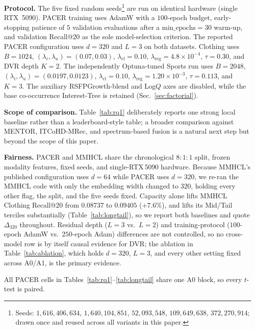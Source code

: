 \documentclass[conference]{IEEEtran}
\newcommand{\dvr}{DVR\xspace}
\begin{document}
\noindent\textbf{Protocol.} The five fixed random
seeds\footnote{Seeds: $1{,}616{,}406{,}634$, $1{,}640{,}104{,}851$,
$52{,}093{,}548$, $109{,}649{,}638$, $372{,}270{,}914$; drawn once
and reused across all variants in this paper.} are run on identical
hardware (single RTX~5090). PACER training uses AdamW with a $100$-epoch
budget, early-stopping patience of $5$ validation evaluations after a
$\text{min\_epochs}{=}30$ warm-up, and validation Recall@20 as the
sole model-selection criterion. The reported PACER configuration
uses $d{=}320$ and $L{=}3$ on both datasets. Clothing uses
$B{=}1024$, $(\lambda_i,\lambda_u){=}(0.07,0.03)$,
$\lambda_{\text{cl}}{=}0.10$, $\lambda_{\text{reg}}{=}4.8{\times}10^{-4}$,
$\tau{=}0.30$, and \dvr depth $K{=}2$. The independently Optuna-tuned
Sports run uses $B{=}2048$, $(\lambda_i,\lambda_u)
{=}(0.0197,0.0123)$, $\lambda_{\text{cl}}{=}0.10$,
$\lambda_{\text{reg}}{=}1.20{\times}10^{-3}$,
$\tau{=}0.113$, and $K{=}3$. The auxiliary
RSFPGrowth-blend and Log$Q$ axes are disabled, while the base
co-occurrence Interest-Tree is retained (Sec.~\ref{sec:factorial}).

\noindent\textbf{Scope of comparison.} Table~\ref{tab:rq1}
deliberately reports one strong local baseline rather than a
leaderboard-style table; a broader comparison against MENTOR,
ITCoHD-MRec, and spectrum-based fusion is a natural next step but
beyond the scope of this paper.

\noindent\textbf{Fairness.} PACER and MMHCL share the chronological
$8{:}1{:}1$ split, frozen modality features, fixed seeds, and
single-RTX\,5090 hardware. Because MMHCL's published configuration
uses $d{=}64$ while PACER uses $d{=}320$, we re-ran the MMHCL code
with only the embedding width changed to $320$, holding every other
flag, the split, and the five seeds fixed. Capacity alone lifts MMHCL
Clothing Recall@20 from $0.08737$ to $0.09405$ ($+7.6\%$), and lifts
its Mid/Tail terciles substantially (Table~\ref{tab:longtail}), so we
report both baselines and quote $\Delta_{320}$ throughout. Residual depth
($L{=}3$ vs.\ $L{=}2$) and training-protocol ($100$-epoch AdamW vs.\
$250$-epoch Adam) differences are not controlled, so no cross-model
row is by itself causal evidence for \dvr; the ablation in
Table~\ref{tab:ablation}, which holds $d{=}320$, $L{=}3$, and every
other setting fixed across A0/A1, is the primary evidence.

All PACER cells in Tables~\ref{tab:rq1}--\ref{tab:longtail} share one
A0 block, so every $t$-test is paired.

\end{document}
